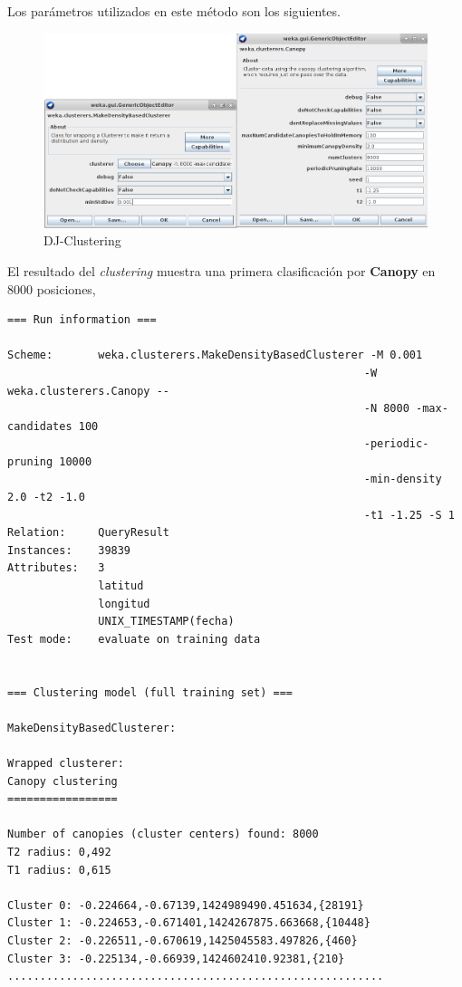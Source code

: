 \documentclass[a4paper, 12pt]{article}
\begin{document}
Los par\'ametros utilizados en este m\'etodo son los siguientes.\\

\begin{figure}[!htbp]
\centering
	\includegraphics[scale=.55]{wekaDJClusterParametersTotal.png}
\caption{DJ-Clustering}
\end{figure}


El resultado del \textit{clustering} muestra una primera clasificaci\'on por \textbf{Canopy} en $8000$ posiciones,\\

\begin{verbatim}
=== Run information ===

Scheme:       weka.clusterers.MakeDensityBasedClusterer -M 0.001 
													   -W weka.clusterers.Canopy -- 
													   -N 8000 -max-candidates 100 
													   -periodic-pruning 10000 
													   -min-density 2.0 -t2 -1.0 
													   -t1 -1.25 -S 1
Relation:     QueryResult
Instances:    39839
Attributes:   3
              latitud
              longitud
              UNIX_TIMESTAMP(fecha)
Test mode:    evaluate on training data


=== Clustering model (full training set) ===

MakeDensityBasedClusterer: 

Wrapped clusterer: 
Canopy clustering
=================

Number of canopies (cluster centers) found: 8000
T2 radius: 0,492     
T1 radius: 0,615     

Cluster 0: -0.224664,-0.67139,1424989490.451634,{28191}
Cluster 1: -0.224653,-0.671401,1424267875.663668,{10448} 
Cluster 2: -0.226511,-0.670619,1425045583.497826,{460}
Cluster 3: -0.225134,-0.66939,1424602410.92381,{210}
..........................................................
\end{verbatim}
\end{document}

